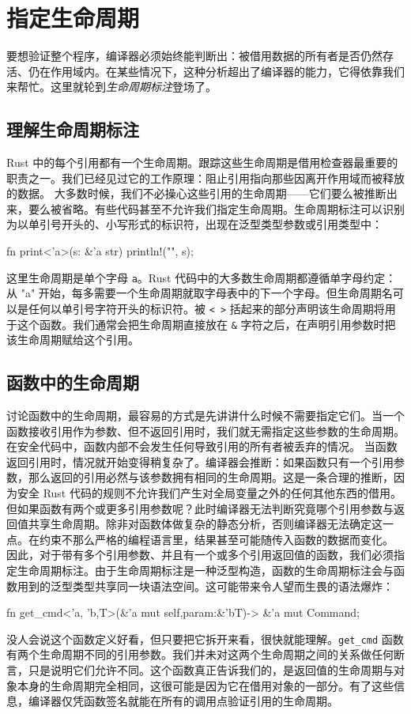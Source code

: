 \section{指定生命周期}
要想验证整个程序，编译器必须始终能判断出：被借用数据的所有者是否仍然存活、仍在作用域内。在某些情况下，这种分析超出了编译器的能力，它得依靠我们来帮忙。这里就轮到\emph{生命周期标注}登场了。
\subsection{理解生命周期标注}
\label{idx:idx_ee94bd1c}
Rust 中的每个引用都有一个生命周期。跟踪这些生命周期是借用检查器最重要的职责之一。我们已经见过它的工作原理：阻止引用指向那些因离开作用域而被释放的数据。
大多数时候，我们不必操心这些引用的生命周期——它们要么被推断出来，要么被省略。有些代码甚至不允许我们指定生命周期。生命周期标注可以识别为以单引号开头的、小写形式的标识符，出现在泛型类型参数或引用类型中：
\begin{codebox}[rust]
 fn print<'a>(s: &'a str) {
    println!("{}", s);
}
\end{codebox}
这里生命周期是单个字母 \texttt{a}。Rust 代码中的大多数生命周期都遵循单字母约定：从 "a" 开始，每多需要一个生命周期就取字母表中的下一个字母。但生命周期名可以是任何以单引号字符开头的标识符。被 \texttt{< >} 括起来的部分声明该生命周期将用于这个函数。我们通常会把生命周期直接放在 \texttt{\&} 字符之后，在声明引用参数时把该生命周期赋给这个引用。
\subsection{函数中的生命周期}
\label{idx:idx_9910935f}
讨论函数中的生命周期，最容易的方式是先讲讲什么时候不需要指定它们。当一个函数接收引用作为参数、但不返回引用时，我们就无需指定这些参数的生命周期。在安全代码中，函数内部不会发生任何导致引用的所有者被丢弃的情况。
当函数返回引用时，情况就开始变得稍复杂了。编译器会推断：如果函数只有一个引用参数，那么返回的引用必然与该参数拥有相同的生命周期。这是一条合理的推断，因为安全 Rust 代码的规则不允许我们产生对全局变量之外的任何其他东西的借用。
但如果函数有两个或更多引用参数呢？此时编译器无法判断究竟哪个引用参数与返回值共享生命周期。除非对函数体做复杂的静态分析，否则编译器无法确定这一点。在约束不那么严格的编程语言里，结果甚至可能随传入函数的数据而变化。
因此，对于带有多个引用参数、并且有一个或多个引用返回值的函数，我们必须指定生命周期标注。由于生命周期标注是一种泛型构造，函数的生命周期标注会与函数用到的泛型类型共享同一块语法空间。这可能带来令人望而生畏的语法爆炸：
\begin{codebox}[rust]
fn get_cmd<'a, 'b,T>(&'a mut self,param:&'bT)-> &'a mut Command;
\end{codebox}
\label{idx:idx_895179bc}
没人会说这个函数定义好看，但只要把它拆开来看，很快就能理解。\texttt{get\_cmd} 函数有两个生命周期不同的引用参数。我们并未对这两个生命周期之间的关系做任何断言，只是说明它们允许不同。这个函数真正告诉我们的，是返回值的生命周期与对象本身的生命周期完全相同，这很可能是因为它在借用对象的一部分。有了这些信息，编译器仅凭函数签名就能在所有的调用点验证引用的生命周期。
